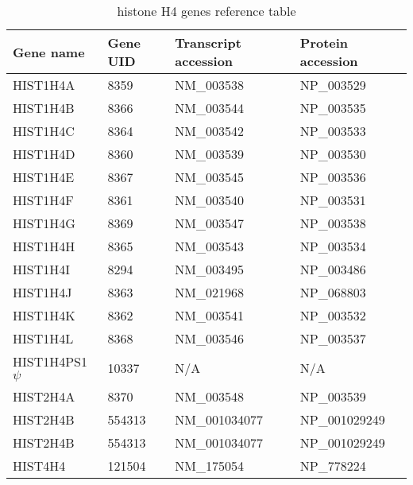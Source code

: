 \begin{table}
  \centering
  \begin{tabular}{l | l | l | l }
    Gene name & Gene UID & Transcript accession & Protein accession \\
    \hline
     HIST1H4A & 8359 & NM\_003538 & NP\_003529 \\
     HIST1H4B & 8366 & NM\_003544 & NP\_003535 \\
     HIST1H4C & 8364 & NM\_003542 & NP\_003533 \\
     HIST1H4D & 8360 & NM\_003539 & NP\_003530 \\
     HIST1H4E & 8367 & NM\_003545 & NP\_003536 \\
     HIST1H4F & 8361 & NM\_003540 & NP\_003531 \\
     HIST1H4G & 8369 & NM\_003547 & NP\_003538 \\
     HIST1H4H & 8365 & NM\_003543 & NP\_003534 \\
     HIST1H4I & 8294 & NM\_003495 & NP\_003486 \\
     HIST1H4J & 8363 & NM\_021968 & NP\_068803 \\
     HIST1H4K & 8362 & NM\_003541 & NP\_003532 \\
     HIST1H4L & 8368 & NM\_003546 & NP\_003537 \\
     HIST1H4PS1 $\psi$ & 10337 & N/A & N/A \\
     HIST2H4A & 8370 & NM\_003548 & NP\_003539 \\
     HIST2H4B & 554313 & NM\_001034077 & NP\_001029249 \\
     HIST2H4B & 554313 & NM\_001034077 & NP\_001029249 \\
     HIST4H4 & 121504 & NM\_175054 & NP\_778224 \\
  \end{tabular}
  \caption{histone H4 genes reference table}
  \label{tab:h4-ref}
\end{table}
